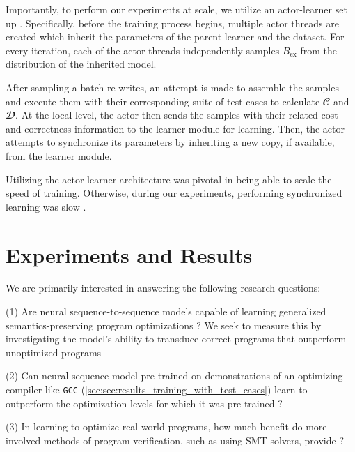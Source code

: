 \documentclass{article}
\begin{document}
Importantly, to perform our experiments at scale, we utilize an actor-learner set up  \citep{liang2018memory, espeholt2018impala}. Specifically, before the training process begins, multiple actor threads are created which inherit the parameters of the parent learner and the dataset. For every iteration, each of the actor threads independently samples $B_{\textrm{ex}}$ from the distribution of the inherited model. 

After sampling a batch re-writes, an attempt is made to assemble the samples and execute them with their corresponding suite of test cases to calculate $\mathbfcal{C}$ and $\mathbfcal{D}$. At the local level, the actor then sends the samples with their related cost and correctness information to the learner module for learning. Then, the actor attempts to synchronize its parameters by inheriting a new copy, if available, from the learner module.

Utilizing the actor-learner architecture was pivotal in being able to scale the speed of training. Otherwise, during our experiments, performing synchronized learning was slow . 


\section{Experiments and Results}
\label{sec:experiments}

We are primarily interested in answering the following research questions: 

(1) Are neural sequence-to-sequence models capable of learning generalized semantics-preserving program optimizations ? We seek to measure this by investigating the model's ability to transduce correct programs that outperform unoptimized programs 

(2) Can neural sequence model pre-trained on demonstrations of an optimizing compiler like \texttt{GCC} (\cref{sec:sec:results_training_with_test_cases}) learn to outperform the optimization levels for which it was pre-trained ? 

(3) In learning to optimize real world programs, how much benefit do more involved methods of program verification, such as using SMT solvers, provide ? 
\end{document}
